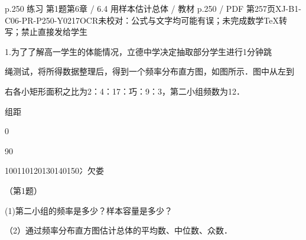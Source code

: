 \begin{bankitem}{p.250 练习 第1题}{第6章 / 6.4 用样本估计总体 / 教材 p.250 / PDF 第257页}{XJ-B1-C06-PR-P250-Y0217}{OCR未校对：公式与文字均可能有误；未完成数学TeX转写；禁止直接发给学生}
\begin{ocrdraft}
\par
1.为了了解高一学生的体能情况，立德中学决定抽取部分学生进行1分钟跳
\par
绳测试，将所得数据整理后，得到一个频率分布直方图，如图所示．图中从左到
\par
右各小矩形面积之比为2：4：17：巧：9：3，第二小组频数为12．
\par
组距
\par
0
\par
90
\par
100110120130140150冫欠娄
\par
（第1题）
\par
(1)第二小组的频率是多少？样本容量是多少？
\par
（2）通过频率分布直方图估计总体的平均数、中位数、众数．
\end{ocrdraft}
\end{bankitem}
